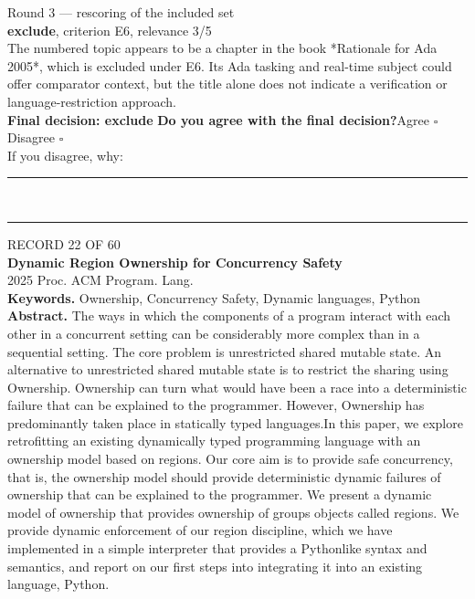 \documentclass[11pt,a4paper]{article}
\begin{document}
{\footnotesize\color{soft}Round 3 --- rescoring of the included set}\\[0.5mm]
{\small\textbf{exclude}, criterion E6, relevance 3/5}\\[0.5mm]
{\small The numbered topic appears to be a chapter in the book *Rationale for Ada 2005*, which is excluded under E6. Its Ada tasking and real-time subject could offer comparator context, but the title alone does not indicate a verification or language-restriction approach.}\\[2.5mm]
{\small\textbf{Final decision: exclude}}
\vspace{2mm}
{\small\textbf{Do you agree with the final decision?}\quad{}Agree $\square$\qquad{}Disagree $\square$}\\[1mm]
{\footnotesize\color{soft}If you disagree, why:}\\[1mm]
\color{rule}\rule{\linewidth}{0.3pt}\\[3mm]\rule{\linewidth}{0.3pt}\color{black}
\clearpage
{\color{soft}\footnotesize RECORD 22 OF 60}\\[1mm]
{\large\bfseries Dynamic Region Ownership for Concurrency Safety}\\[1.5mm]
{\color{soft}\small 2025 \textperiodcentered{} Proc. ACM Program. Lang.}\\[2mm]
{\small\textbf{Keywords.} Ownership, Concurrency Safety, Dynamic languages, Python}\\[2mm]
{\small\textbf{Abstract.} The ways in which the components of a program interact with each other in a concurrent setting can be considerably more complex than in a sequential setting. The core problem is unrestricted shared mutable state. An alternative to unrestricted shared mutable state is to restrict the sharing using Ownership. Ownership can turn what would have been a race into a deterministic failure that can be explained to the programmer. However, Ownership has predominantly taken place in statically typed languages.In this paper, we explore retrofitting an existing dynamically typed programming language with an ownership model based on regions. Our core aim is to provide safe concurrency, that is, the ownership model should provide deterministic dynamic failures of ownership that can be explained to the programmer. We present a dynamic model of ownership that provides ownership of groups objects called regions. We provide dynamic enforcement of our region discipline, which we have implemented in a simple interpreter that provides a Pythonlike syntax and semantics, and report on our first steps into integrating it into an existing language, Python.}
\end{document}
